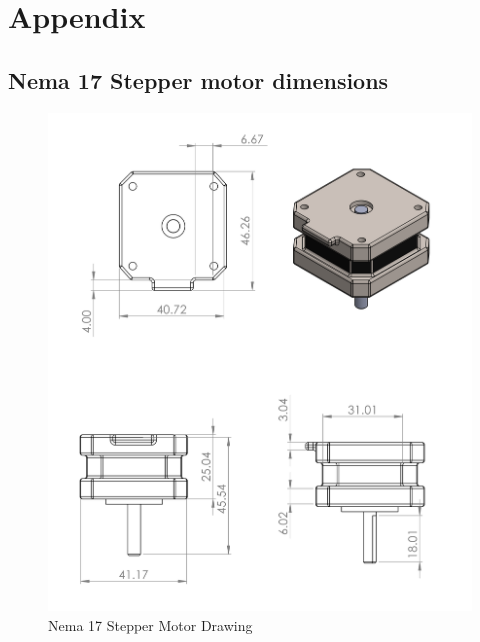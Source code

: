 \appendix
\section{Appendix}


\subsection{Nema 17 Stepper motor dimensions}
    \begin{figure}[H]
        \centering
        \includegraphics[height=.7\textheight, width=\textwidth]{Figures/Nema17StepperMotor.png}
        \caption{Nema 17 Stepper Motor Drawing}
    \end{figure}

